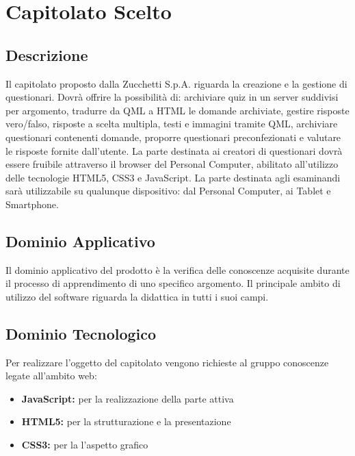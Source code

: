 \section{Capitolato Scelto}
\subsection{Descrizione}
Il capitolato proposto dalla Zucchetti S.p.A. riguarda la creazione e la gestione di questionari. 
Dovrà offrire la possibilità di: archiviare quiz in un server suddivisi per argomento, tradurre da QML a HTML le domande archiviate, gestire risposte vero/falso, risposte a scelta multipla, testi e immagini tramite QML, archiviare questionari contenenti domande, proporre questionari preconfezionati e valutare le risposte fornite dall’utente.
La parte destinata ai creatori di questionari dovrà essere fruibile attraverso il browser del 
Personal Computer, abilitato all’utilizzo delle tecnologie HTML5, CSS3 e JavaScript.
La parte destinata agli esaminandi sarà utilizzabile su qualunque dispositivo: dal Personal Computer, ai Tablet e Smartphone.

\subsection{Dominio Applicativo}
Il dominio applicativo del prodotto è la verifica delle conoscenze acquisite durante il processo di apprendimento di uno specifico argomento.
Il principale ambito di utilizzo del software riguarda la didattica in tutti i suoi campi.

\subsection{Dominio Tecnologico}
Per realizzare l’oggetto del capitolato vengono richieste al gruppo conoscenze legate all’ambito web:
\begin{itemize}
\item \textbf{JavaScript:} per la realizzazione della parte attiva
\item \textbf{HTML5:} per la strutturazione e la presentazione 
\item \textbf{CSS3:} per la l’aspetto grafico
\end{itemize}


